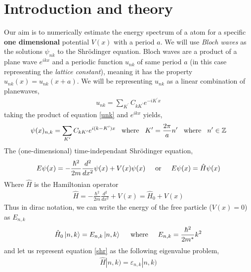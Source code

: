 \documentclass[11pt,a4paper]{article}
\begin{document}
\part*{Introduction and theory}
Our aim is to numerically estimate the energy spectrum of a atom for a specific \textbf{one dimensional} potential $V(x)$ with a period $a$. We will use \emph{Bloch waves} as the solutions $\psi_{nk}$ to the Shrödinger equation. Bloch waves are  a product of a plane wave $e^{ikx}$ and a periodic function $u_{nk}$ of same period $a$ (in this case representing the \emph{lattice constant}), meaning it has the property $u_{nk}(x)=u_{nk}(x+a)$. We will be representing $u_{nk}$ as a linear combination of planewaves,
\begin{align}
u_{nk} = \sum_{K^{\prime}} C_{kK^{\prime}} e^{-iK^{\prime}x} \label{unk}
\end{align}
taking the product of equation \ref{unk} and $e^{ikx}$ yields,
\begin{align}
\psi(x)_{n,k} = \sum_{K^{\prime}} C_{kK^{\prime}} e^{i(k-K^{\prime})x} \hspace{0.3cm} \text{where} \hspace{0.3cm} K^{\prime} = \frac{2\pi }{a}n^{\prime} \hspace{0.3cm} \text{where} \hspace{0.3cm} n^{\prime} \in \mathbb{Z}
\end{align}
The (one-dimensional) time-independant Shrödinger equation,
\begin{align}
E\psi(x) = -\frac{\hbar^2}{2m} \frac{d^2}{dx^2} \psi(x) + V(x) \psi(x) \hspace{0.5cm} \text{or} \hspace{0.5cm} E\psi(x) = \hat{H} \psi(x) \label{shr}
\end{align}
Where $\hat{H}$ is the Hamiltonian operator
\begin{align}
\hat{H} = -\frac{\hbar^2}{2m} \frac{d^2}{dx^2} + V(x) = \hat{H}_0 + V(x)
\end{align}
Thus in dirac notation, we can write the energy of the free particle ($V(x)=0$) as $E_{n,k}$
\begin{align}
\hat{H}_0 \ket{n,k} = E_{n,k} \ket{n,k} \hspace{0.5cm} \text{where} \hspace{0.5cm} E_{n,k} = \frac{\hbar^2}{2m^{*}}k^2
\end{align}
and let us represent equation \ref{shr} as the following eigenvalue problem,
\begin{align}
\hat{H} | n,k ) = \varepsilon_{n,k} |n,k) \label{ham}
\end{align}
\end{document}
